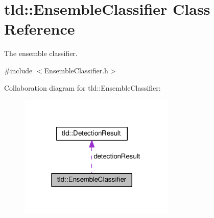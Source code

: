 \hypertarget{classtld_1_1EnsembleClassifier}{\section{tld\-:\-:Ensemble\-Classifier Class Reference}
\label{classtld_1_1EnsembleClassifier}
}


The ensemble classifier.  




{\ttfamily \#include $<$Ensemble\-Classifier.\-h$>$}



Collaboration diagram for tld\-:\-:Ensemble\-Classifier\-:\nopagebreak
\begin{figure}[H]
\begin{center}
\leavevmode
\includegraphics[width=211pt]{classtld_1_1EnsembleClassifier__coll__graph}
\end{center}
\end{figure}
